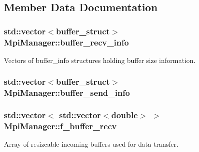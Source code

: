 \subsection{Member Data Documentation}
\subsubsection[{\texorpdfstring{buffer\+\_\+recv\+\_\+info}{buffer_recv_info}}]{\setlength{\rightskip}{0pt plus 5cm}std\+::vector$<${\bf buffer\+\_\+struct}$>$ Mpi\+Manager\+::buffer\+\_\+recv\+\_\+info}\hypertarget{class_mpi_manager_a5e769fa077d24d62d10a9a0d303009d1}{}\label{class_mpi_manager_a5e769fa077d24d62d10a9a0d303009d1}


Vectors of buffer\+\_\+info structures holding buffer size information. 

\subsubsection[{\texorpdfstring{buffer\+\_\+send\+\_\+info}{buffer_send_info}}]{\setlength{\rightskip}{0pt plus 5cm}std\+::vector$<${\bf buffer\+\_\+struct}$>$ Mpi\+Manager\+::buffer\+\_\+send\+\_\+info}\hypertarget{class_mpi_manager_a3a91c2e8cfb15027a0681c198f82d257}{}\label{class_mpi_manager_a3a91c2e8cfb15027a0681c198f82d257}
\subsubsection[{\texorpdfstring{f\+\_\+buffer\+\_\+recv}{f_buffer_recv}}]{\setlength{\rightskip}{0pt plus 5cm}std\+::vector$<$ std\+::vector$<$double$>$ $>$ Mpi\+Manager\+::f\+\_\+buffer\+\_\+recv}\hypertarget{class_mpi_manager_ab8f1eeab50fd4812b3a51af1a6c43713}{}\label{class_mpi_manager_ab8f1eeab50fd4812b3a51af1a6c43713}


Array of resizeable incoming buffers used for data transfer. 

